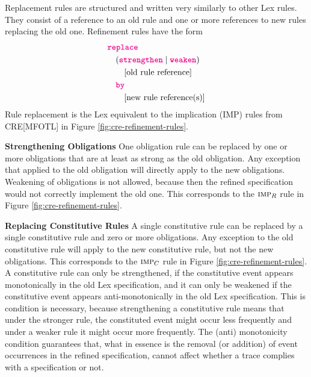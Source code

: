         Replacement rules are structured and written very similarly to
        other Lex rules.
        They consist of a reference to an old rule
        and one or more references to new rules replacing
        the old one.
        Refinement rules have the form
        \begin{align*}
        & {\color{magenta}\texttt{\bfseries\upshape replace}} \\
        & \quad ({\color{magenta}\texttt{\bfseries\upshape strengthen}} \mid {\color{magenta}\texttt{\bfseries\upshape weaken}}) \\
        & \qquad \text{[old rule reference]} \\
        & \quad {\color{magenta}\texttt{\bfseries\upshape by}} \\
        & \qquad \text{[new rule reference(s)]}
        \end{align*}
        Rule replacement is the Lex equivalent to the
        implication (IMP) rules from CRE[MFOTL] in Figure
        \ref{fig:cre-refinement-rules}.

        \textbf{Strengthening Obligations}
        One obligation rule can be replaced by one or
        more obligations that are at least as strong
        as the old obligation.
        Any exception that applied to the old obligation
        will directly apply to the new obligations.
        Weakening of obligations is not allowed, because
        then the refined specification would not correctly
        implement the old one.
        This corresponds to the $\textsc{imp}_R$ rule in
        Figure \ref{fig:cre-refinement-rules}.

        \textbf{Replacing Constitutive Rules}
        A single constitutive rule can be replaced
        by a single constitutive rule and zero
        or more obligations.
        Any exception to the old constitutive rule
        will apply to the new constitutive rule, but
        not the new obligations.
        This corresponds to the $\textsc{imp}_C$ rule
        in Figure \ref{fig:cre-refinement-rules}.
        A constitutive rule can only be strengthened,
        if the constitutive event appears monotonically
        in the old Lex specification, and it can only
        be weakened if the constitutive event appears
        anti-monotonically in the old Lex specification.
        This is condition is necessary, because
        strengthening a constitutive rule means that
        under the stronger rule, the constituted event
        might occur less frequently and under a weaker rule
        it might occur more frequently.
        The (anti) monotonicity condition guarantees that,
        what in essence is the removal (or addition) of
        event occurrences in the refined specification,
        cannot affect whether a trace complies with a
        specification or not.

